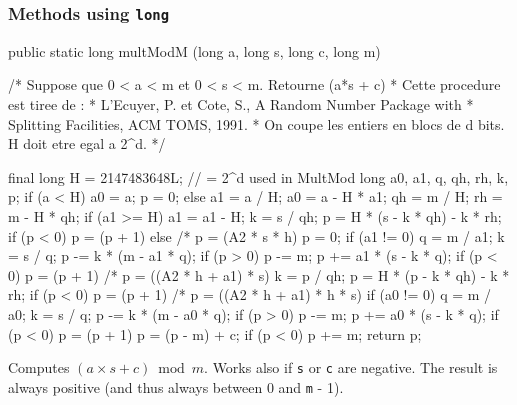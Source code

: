 \subsubsection* {Methods using \texttt{long}}
\begin{code}

   public static long multModM (long a, long s, long c, long m) \begin{hide} {

      /* Suppose que 0 < a < m  et  0 < s < m.   Retourne (a*s + c) %
       * Cette procedure est tiree de :
       * L'Ecuyer, P. et Cote, S., A Random Number Package with
       * Splitting Facilities, ACM TOMS, 1991.
       * On coupe les entiers en blocs de d bits. H doit etre egal a 2^d.  */

      final long H = 2147483648L;               // = 2^d  used in MultMod
      long a0, a1, q, qh, rh, k, p;
      if (a < H) {
         a0 = a;
         p = 0;
      } else {
         a1 = a / H;
         a0 = a - H * a1;
         qh = m / H;
         rh = m - H * qh;
         if (a1 >= H) {
            a1 = a1 - H;
            k = s / qh;
            p = H * (s - k * qh) - k * rh;
            if (p < 0)
               p = (p + 1) %
         } else                      /* p = (A2 * s * h) %
            p = 0;
         if (a1 != 0) {
            q = m / a1;
            k = s / q;
            p -= k * (m - a1 * q);
            if (p > 0)
               p -= m;
            p += a1 * (s - k * q);
            if (p < 0)
               p = (p + 1) %
         }                           /* p = ((A2 * h + a1) * s) %
         k = p / qh;
         p = H * (p - k * qh) - k * rh;
         if (p < 0)
            p = (p + 1) %
      }                               /* p = ((A2 * h + a1) * h * s) %
      if (a0 != 0) {
         q = m / a0;
         k = s / q;
         p -= k * (m - a0 * q);
         if (p > 0)
            p -= m;
         p += a0 * (s - k * q);
         if (p < 0)
            p = (p + 1) %
      }
      p = (p - m) + c;
      if (p < 0)
         p += m;
      return p;
   } \end{hide}
\end{code}
\begin{tabb} Computes $(a \times s + c) \bmod m$. Works also if \texttt{s} 
  or \texttt{c} are negative.
  The result is always positive (and thus always between 0 and \texttt{m} - 1).
\end{tabb}
